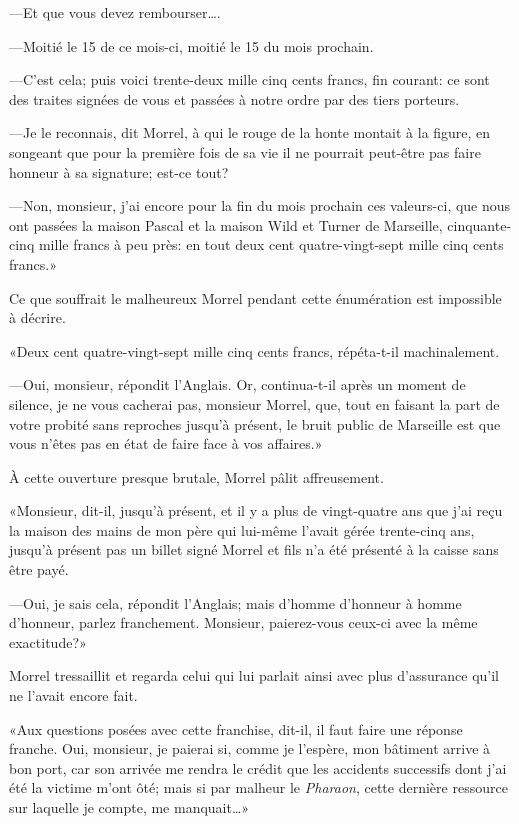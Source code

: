 —Et que vous devez rembourser\dots.

—Moitié le 15 de ce mois-ci, moitié le 15 du mois prochain.

—C'est cela; puis voici trente-deux mille cinq cents francs, fin courant: ce sont des traites signées de vous et passées à notre ordre par des tiers porteurs.

—Je le reconnais, dit Morrel, à qui le rouge de la honte montait à la figure, en songeant que pour la première fois de sa vie il ne pourrait peut-être pas faire honneur à sa signature; est-ce tout?

—Non, monsieur, j'ai encore pour la fin du mois prochain ces valeurs-ci, que nous ont passées la maison Pascal et la maison Wild et Turner de Marseille, cinquante-cinq mille francs à peu près: en tout deux cent quatre-vingt-sept mille cinq cents francs.»

Ce que souffrait le malheureux Morrel pendant cette énumération est impossible à décrire.

«Deux cent quatre-vingt-sept mille cinq cents francs, répéta-t-il machinalement.

—Oui, monsieur, répondit l'Anglais. Or, continua-t-il après un moment de silence, je ne vous cacherai pas, monsieur Morrel, que, tout en faisant la part de votre probité sans reproches jusqu'à présent, le bruit public de Marseille est que vous n'êtes pas en état de faire face à vos affaires.»

À cette ouverture presque brutale, Morrel pâlit affreusement.

«Monsieur, dit-il, jusqu'à présent, et il y a plus de vingt-quatre ans que j'ai reçu la maison des mains de mon père qui lui-même l'avait gérée trente-cinq ans, jusqu'à présent pas un billet signé Morrel et fils n'a été présenté à la caisse sans être payé.

—Oui, je sais cela, répondit l'Anglais; mais d'homme d'honneur à homme d'honneur, parlez franchement. Monsieur, paierez-vous ceux-ci avec la même exactitude?»

Morrel tressaillit et regarda celui qui lui parlait ainsi avec plus d'assurance qu'il ne l'avait encore fait.

«Aux questions posées avec cette franchise, dit-il, il faut faire une réponse franche. Oui, monsieur, je paierai si, comme je l'espère, mon bâtiment arrive à bon port, car son arrivée me rendra le crédit que les accidents successifs dont j'ai été la victime m'ont ôté; mais si par malheur le \textit{Pharaon}, cette dernière ressource sur laquelle je compte, me manquait\dots»

